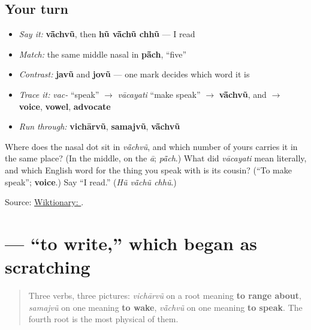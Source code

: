 \subsection*{Your turn}
\begin{itemize}
\raggedright
  \item \emph{Say it:} \textbf{vā̃chvũ}, then \textbf{hũ vā̃chũ chhũ} — I read
  \item \emph{Match:} the same middle nasal in \textbf{pā̃ch}, \textquotedblleft{}five\textquotedblright{}
  \item \emph{Contrast:} \textbf{javũ} and \textbf{jovũ} — one mark decides which word it is
  \item \emph{Trace it:} \emph{vac-} \textquotedblleft{}speak\textquotedblright{} $\to$ \emph{vācayati} \textquotedblleft{}make speak\textquotedblright{} $\to$ \textbf{vā̃chvũ}, and $\to$ \textbf{voice}, \textbf{vowel}, \textbf{advocate}
  \item \emph{Run through:} \textbf{vichārvũ}, \textbf{samajvũ}, \textbf{vā̃chvũ}
\end{itemize}

\begin{tcolorbox}[breakable,colback=teal!4,colframe=teal!35!black,title={Before you move on}]
Where does the nasal dot sit in \emph{vā̃chvũ}, and which number of yours carries it in the same place? (In the middle, on the \emph{ā}; \emph{pā̃ch}.) What did \emph{vācayati} mean literally, and which English word for the thing you speak with is its cousin? (\textquotedblleft{}To make speak\textquotedblright{}; \textbf{voice}.) Say \textquotedblleft{}I read.\textquotedblright{} (\emph{Hũ vā̃chũ chhũ}.)

Source: \href{https://en.wiktionary.org/wiki/\%E0\%AA\%B5\%E0\%AA\%BE\%E0\%AA\%82\%E0\%AA\%9A\%E0\%AA\%B5\%E0\%AB\%81\%E0\%AA\%82}{Wiktionary: }.
\end{tcolorbox}
\section[lakhvũ]{ — \textquotedblleft{}to write,\textquotedblright{} which began as scratching}

\label{lesson:GU-C08-lakhvun}



\begin{quote}
Three verbs, three pictures: \emph{vichārvũ} on a root meaning \textbf{to range about}, \emph{samajvũ} on one meaning \textbf{to wake}, \emph{vā̃chvũ} on one meaning \textbf{to speak}. The fourth root is the most physical of them.
\end{quote}

